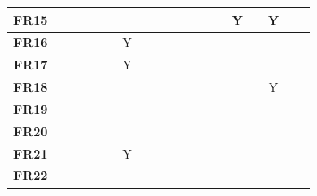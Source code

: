 \documentclass{article}
\begin{document}
\begin{table}[H]
\begin{adjustwidth}{-1.87in}{-1in}
\begin{tabular}{c|c|c|c|c|c|c|c|c|c|c|c|c|c|c|c|c|c|c|}
\multicolumn{1}{|c|}{\textbf{FR15}} &              &              &              &              &              &              &              &              &              &              &              &              &              & Y            &             & Y           &             &             \\ \hline
\multicolumn{1}{|c|}{\textbf{FR16}} &              &              &              &              &              & Y            &              &              &              &              &              &              &              &              &             &             &             &             \\ \hline
\multicolumn{1}{|c|}{\textbf{FR17}} &              &              &              &              &              & Y            &              &              &              &              &              &              &              &              &             &             &             &             \\ \hline
\multicolumn{1}{|c|}{\textbf{FR18}} &              &              &              &              &              &              &              &              &              &              &              &              &              &              &             & Y           &             &             \\ \hline
\multicolumn{1}{|c|}{\textbf{FR19}} &              &              &              &              &              &              &              &              &              &              &              &              &              &              &             &             &             &             \\ \hline
\multicolumn{1}{|c|}{\textbf{FR20}} &              &              &              &              &              &              &              &              &              &              &              &              &              &              &             &             &             &             \\ \hline
\multicolumn{1}{|c|}{\textbf{FR21}} &              &              &              &              &              & Y            &              &              &              &              &              &              &              &              &             &             &             &             \\ \hline
\multicolumn{1}{|c|}{\textbf{FR22}} &              &              &              &              &              &              &              &              &              &              &              &              &              &              &             &             &             &             \\ \hline

\end{tabular}
\end{adjustwidth}
\end{table}
\end{document}
